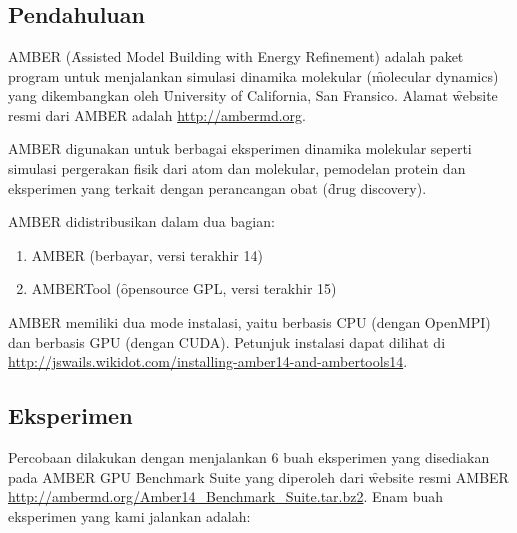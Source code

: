 \chapter{\topikEmpat}

\section{Pendahuluan}

AMBER (\f{Assisted Model Building with Energy Refinement}) adalah paket program untuk menjalankan simulasi dinamika molekular (\f{molecular dynamics}) yang dikembangkan oleh \f{University of California}, San Fransico. Alamat \f{website} resmi dari AMBER adalah \url{http://ambermd.org}.

AMBER digunakan untuk berbagai eksperimen dinamika molekular seperti simulasi pergerakan fisik dari atom dan molekular, pemodelan protein dan eksperimen yang terkait dengan perancangan obat (\f{drug discovery}).

AMBER didistribusikan dalam dua bagian:

\begin{enumerate}
	\item AMBER (berbayar, versi terakhir 14)
	\item AMBERTool (\f{opensource} GPL, versi terakhir 15)
\end{enumerate}

AMBER memiliki dua mode instalasi, yaitu berbasis CPU (dengan OpenMPI) dan berbasis GPU (dengan CUDA). Petunjuk instalasi dapat dilihat di \url{http://jswails.wikidot.com/installing-amber14-and-ambertools14}.

\section{Eksperimen}

Percobaan dilakukan dengan menjalankan 6 buah eksperimen yang disediakan pada AMBER GPU \f{Benchmark Suite} yang diperoleh dari \f{website} resmi AMBER \url{http://ambermd.org/Amber14_Benchmark_Suite.tar.bz2}. Enam buah eksperimen yang kami jalankan adalah:

